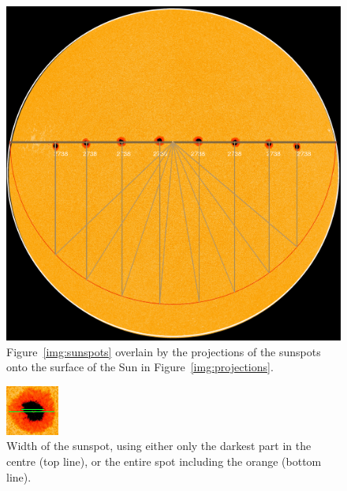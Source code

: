 \documentclass[11pt]{article}
\begin{document}
\begin{figure}[h]
\includegraphics[width=\columnwidth]{figures/sunspots_projections.png}
\caption{Figure~\ref{img:sunspots} overlain by the projections of the sunspots onto the surface of the Sun in Figure~\ref{img:projections}.}
\label{img:sunspots_projections}
\end{figure}

\begin{figure}[h]
\includegraphics[width=\columnwidth]{figures/sunspot_width.png}
\caption{Width of the sunspot, using either only the darkest part in the centre (top line), or the entire spot including the orange (bottom line).}
\label{img:sunspot_width}
\end{figure}


\printbibliography
\end{document}
